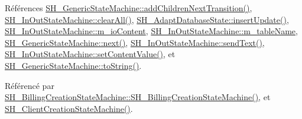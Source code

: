 Références \hyperlink{classSH__GenericStateMachine_a22433f8df2f41120a05bfa4bbfa9e0ae}{S\-H\-\_\-\-Generic\-State\-Machine\-::add\-Children\-Next\-Transition()}, \hyperlink{classSH__InOutStateMachine_aa1d5860888c96ff94c55dc77e0fdfdcf}{S\-H\-\_\-\-In\-Out\-State\-Machine\-::clear\-All()}, \hyperlink{classSH__AdaptDatabaseState_a037db544ea05f42d21fcbdda758839fe}{S\-H\-\_\-\-Adapt\-Database\-State\-::insert\-Update()}, \hyperlink{classSH__InOutStateMachine_a8cfbc27eef057bf37b7711bdfef2077e}{S\-H\-\_\-\-In\-Out\-State\-Machine\-::m\-\_\-io\-Content}, \hyperlink{classSH__InOutStateMachine_aa009eecc5ab6181358faafb5996b6006}{S\-H\-\_\-\-In\-Out\-State\-Machine\-::m\-\_\-table\-Name}, \hyperlink{classSH__GenericStateMachine_af4771d31d87951c997fba1633c2d67f6}{S\-H\-\_\-\-Generic\-State\-Machine\-::next()}, \hyperlink{classSH__InOutStateMachine_a5e7f5958bae31696b6a8deab94ad2b4f}{S\-H\-\_\-\-In\-Out\-State\-Machine\-::send\-Text()}, \hyperlink{classSH__InOutStateMachine_a9ab1534306b2bdb62743d4bcefe40c17}{S\-H\-\_\-\-In\-Out\-State\-Machine\-::set\-Content\-Value()}, et \hyperlink{classSH__GenericStateMachine_a85c0c1c9d258ae991f84667412fa47cd}{S\-H\-\_\-\-Generic\-State\-Machine\-::to\-String()}.



Référencé par \hyperlink{classSH__BillingCreationStateMachine_ad62b77fa4aeafe200056ff3974562f83}{S\-H\-\_\-\-Billing\-Creation\-State\-Machine\-::\-S\-H\-\_\-\-Billing\-Creation\-State\-Machine()}, et \hyperlink{classSH__ClientCreationStateMachine_a0b406b0f404c0fd33bf35be8ce0cc811}{S\-H\-\_\-\-Client\-Creation\-State\-Machine()}.


